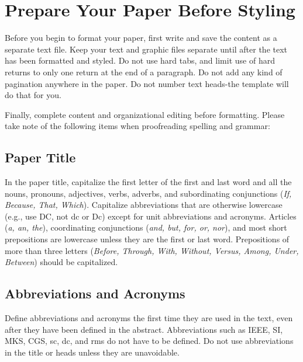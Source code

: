 \documentclass [a4paper,final,conference,10pt]{IDAACS}
\begin{document}
\section{Prepare Your Paper Before Styling}

Before you begin to format your paper, first write and save the content as a 
separate text file. Keep your text and graphic files separate until after the
text has been formatted and styled. Do not use hard tabs, and limit use of 
hard returns to only one return at the end of a paragraph. Do not add any 
kind of pagination anywhere in the paper. Do not number text heads-the 
template will do that for you.

Finally, complete content and organizational editing before formatting. 
Please take note of the following items when proofreading spelling and 
grammar:

\subsection{Paper Title}
In the paper title, capitalize the first letter of the first and 
last word and all the nouns, pronouns, adjectives, verbs, adverbs, 
and subordinating conjunctions (\textit{If, Because, That, Which}). 
Capitalize abbreviations that are otherwise lowercase (e.g., use DC, not dc or 
Dc) except for unit abbreviations and acronyms. Articles (\textit{a, an, the}),
coordinating conjunctions (\textit{and, but, for, or, nor}), and most short 
prepositions are lowercase unless they are the first or last word. Prepositions
of more than three letters (\textit{Before, Through, With, Without, Versus, 
Among, Under, Between}) should be capitalized.

\subsection{Abbreviations and Acronyms}

Define abbreviations and acronyms the first time they are used in the text, 
even after they have been defined in the abstract. Abbreviations such as 
IEEE, SI, MKS, CGS, sc, dc, and rms do not have to be defined. Do not use 
abbreviations in the title or heads unless they are unavoidable.
\end{document}
